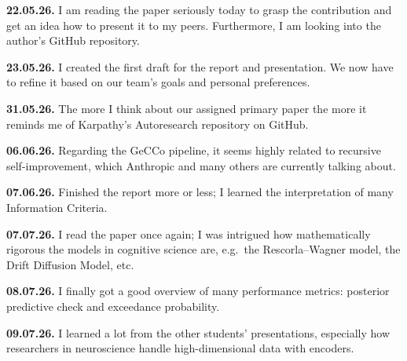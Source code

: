 \textbf{22.05.26.} I am reading the paper seriously today to grasp the contribution and get an idea how to present it to my peers. Furthermore, I am looking into the author's GitHub repository.
 
\textbf{23.05.26.} I created the first draft for the report and presentation. We now have to refine it based on our team's goals and personal preferences.
 
\textbf{31.05.26.} The more I think about our assigned primary paper the more it reminds me of Karpathy's Autoresearch repository on GitHub.
 
\textbf{06.06.26.} Regarding the GeCCo pipeline, it seems highly related to recursive self-improvement, which Anthropic and many others are currently talking about.
 
\textbf{07.06.26.} Finished the report more or less; I learned the interpretation of many Information Criteria.
 
\textbf{07.07.26.} I read the paper once again; I was intrigued how mathematically rigorous the models in cognitive science are, e.g.\ the Rescorla--Wagner model, the Drift Diffusion Model, etc.
 
\textbf{08.07.26.} I finally got a good overview of many performance metrics: posterior predictive check and exceedance probability.
 
\textbf{09.07.26.} I learned a lot from the other students' presentations, especially how researchers in neuroscience handle high-dimensional data with encoders.
 
